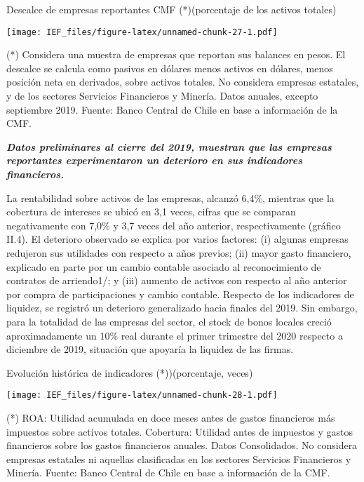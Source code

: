 \documentclass[
]{book}
\begin{document}
Descalce de empresas reportantes CMF (*)(porcentaje de los activos totales)

\texttt{[image: IEF\_files/figure-latex/unnamed-chunk-27-1.pdf]}

(*) Considera una muestra de empresas que reportan sus balances en pesos. El descalce se calcula como pasivos en dólares menos activos en dólares, menos posición neta en derivados, sobre activos totales. No considera empresas estatales, y de los sectores Servicios Financieros y Minería. Datos anuales, excepto septiembre 2019.
Fuente: Banco Central de Chile en base a información de la CMF.

\textbf{\emph{Datos preliminares al cierre del 2019, muestran que las empresas
reportantes experimentaron un deterioro en sus indicadores
financieros.}}

La rentabilidad sobre activos de las empresas, alcanzó 6,4\%, mientras que
la cobertura de intereses se ubicó en 3,1 veces, cifras que se comparan
negativamente con 7,0\% y 3,7 veces del año anterior, respectivamente (gráfico
II.4). El deterioro observado se explica por varios factores: (i) algunas empresas
redujeron sus utilidades con respecto a años previos; (ii) mayor gasto financiero,
explicado en parte por un cambio contable asociado al reconocimiento de
contratos de arriendo1/; y (iii) aumento de activos con respecto al año anterior
por compra de participaciones y cambio contable. Respecto de los indicadores
de liquidez, se registró un deterioro generalizado hacia finales del 2019. Sin
embargo, para la totalidad de las empresas del sector, el stock de bonos locales
creció aproximadamente un 10\% real durante el primer trimestre del 2020
respecto a diciembre de 2019, situación que apoyaría la liquidez de las firmas.

Evolución histórica de indicadores (*))(porcentaje, veces)

\texttt{[image: IEF\_files/figure-latex/unnamed-chunk-28-1.pdf]}

(*) ROA: Utilidad acumulada en doce meses antes de gastos financieros más impuestos sobre activos totales. Cobertura: Utilidad antes de impuestos y gastos financieros sobre los gastos financieros anuales. Datos Consolidados. No considera empresas estatales ni aquellas clasificadas en los sectores Servicios Financieros y Minería.
Fuente: Banco Central de Chile en base a información de la CMF.
\end{document}
